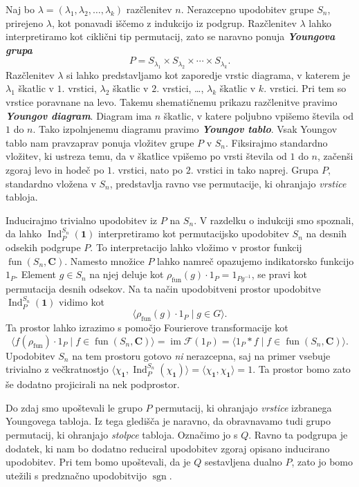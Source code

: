 \documentclass[11pt]{book}
\def\CC{\mathbf{C}}
\def\11{\mathbf{1}}
\def\Fcal{\mathcal{F}}
\DeclareMathOperator\image{im}
\DeclareMathOperator\sgn{sgn}
\DeclareMathOperator\Ind{Ind}
\DeclareMathOperator\fun{fun}
\def\definicija{\color{rdeca}\bf\em}
\theoremstyle{definition}
\theoremstyle{zgled}
\theoremstyle{odprtproblem}
\theoremstyle{domacanaloga}
\theoremstyle{izrek}
\begin{document}
Naj bo $\lambda = (\lambda_1, \lambda_2, \dots, \lambda_k)$ razčlenitev $n$. Nerazcepno upodobitev grupe $S_n$, prirejeno $\lambda$, kot ponavadi iščemo z indukcijo iz podgrup. Razčlenitev $\lambda$ lahko interpretiramo kot ciklični tip permutacij, zato se naravno ponuja {\definicija Youngova grupa}
\[
    P = S_{\lambda_1} \times S_{\lambda_2} \times \cdots \times S_{\lambda_k}.
\]
Razčlenitev $\lambda$ si lahko predstavljamo kot zaporedje vrstic diagrama, v katerem je $\lambda_1$ škatlic v $1$. vrstici, $\lambda_2$ škatlic v $2$. vrstici, \dots, $\lambda_k$ škatlic v $k$. vrstici. Pri tem so vrstice poravnane na levo. Takemu shematičnemu prikazu razčlenitve pravimo {\definicija Youngov diagram}. Diagram ima $n$ škatlic, v katere poljubno vpišemo števila od $1$ do $n$. Tako izpolnjenemu diagramu pravimo {\definicija Youngov tablo}. Vsak Youngov tablo nam pravzaprav ponuja vložitev grupe $P$ v $S_n$. Fiksirajmo standardno vložitev, ki ustreza temu, da v škatlice vpišemo po vrsti števila od $1$ do $n$, začenši zgoraj levo in hodeč po $1$. vrstici, nato po $2$. vrstici in tako naprej. Grupa $P$, standardno vložena v $S_n$, predstavlja ravno vse permutacije, ki ohranjajo \emph{vrstice} tabloja. 

Inducirajmo trivialno upodobitev iz $P$ na $S_n$. V razdelku o indukciji smo spoznali, da lahko $\Ind^{S_n}_{P}(\11)$ interpretiramo kot permutacijsko upodobitev $S_n$ na desnih odsekih podgrupe $P$. To interpretacijo lahko vložimo v prostor funkcij $\fun(S_n, \CC)$. Namesto množice $P$ lahko namreč opazujemo indikatorsko funkcijo $1_P$. Element $g \in S_n$ na njej deluje kot
$\rho_{\fun}(g) \cdot 1_P = 1_{P g^{-1}}$, se pravi kot permutacija desnih odsekov. Na ta način upodobitveni prostor upodobitve $\Ind^{S_n}_{P}(\11)$ vidimo kot 
\[
    \langle \rho_{\fun}(g) \cdot 1_{P} \mid g \in G \rangle.
\]
Ta prostor lahko izrazimo s pomočjo Fourierove transformacije kot
\[
    \langle \hat{f}(\rho_{\fun}) \cdot 1_P \mid f \in \fun(S_n, \CC) \rangle
    = \image \Fcal(1_P)
    = \langle 1_P * f \mid f \in \fun(S_n, \CC) \rangle.    
\]
Upodobitev $S_n$ na tem prostoru gotovo \emph{ni} nerazcepna, saj na primer vsebuje trivialno z večkratnostjo $\langle \chi_{\11}, \Ind^{S_n}_{P}(\chi_{\11}) \rangle = \langle \chi_{\11}, \chi_{\11} \rangle = 1$. Ta prostor bomo zato še dodatno projicirali na nek podprostor.

Do zdaj smo upoštevali le grupo $P$ permutacij, ki ohranjajo \emph{vrstice} izbranega Youngovega tabloja. Iz tega gledišča je naravno, da obravnavamo tudi grupo permutacij, ki ohranjajo \emph{stolpce} tabloja. Označimo jo s $Q$. Ravno ta podgrupa je dodatek, ki nam bo dodatno reduciral upodobitev zgoraj opisano inducirano upodobitev. Pri tem bomo upoštevali, da je $Q$ sestavljena dualno $P$, zato jo bomo utežili s predznačno upodobitvijo $\sgn$.
\end{document}

